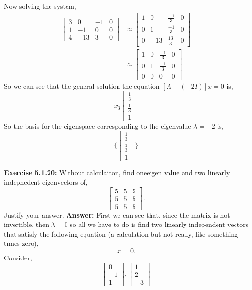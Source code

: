 \documentclass{amsart}
\begin{document}
Now solving the system,
\begin{align*}
\begin{bmatrix}
3&0& -1&0\\ 
1& -1& 0&0\\
4 &-13& 3&0
\end{bmatrix} 
&\approx
\begin{bmatrix}
1&0& \frac{-1}{3}&0\\ 
0& 1& \frac{-1}{3}&0\\
0&-13& \frac{13}{3}&0
\end{bmatrix} \\
&\approx
\begin{bmatrix}
1&0& \frac{-1}{3}&0\\ 
0& 1& \frac{-1}{3}&0\\
0 &0& 0&0
\end{bmatrix}
\end{align*}
So we can see that the general solution the equation $[A - (-2I)]x  = 0$ is,
\begin{equation*}
x_3
\begin{bmatrix}
\frac{1}{3}\\
\frac{1}{3}\\
1
\end{bmatrix}
\end{equation*}
So the basis for the eigenspace corresponding to the eigenvalue $\lambda  = -2$ is,
\begin{equation*}
\{ \begin{bmatrix}
\frac{1}{3}\\
\frac{1}{3}\\
1
\end{bmatrix}\}
\end{equation*}

\vspace{1in}


\noindent\textbf{Exercise 5.1.20: } Without calculaiton, find oneeigen value and two linearly indepnedent eigenvectors of,
\begin{equation*}
\begin{bmatrix}
5&5&5\\
5&5&5\\
5&5&5
\end{bmatrix}.
\end{equation*}
Justify your answer.
\noindent \textbf{Answer: } First we can see that, since the matrix is not invertible, then $\lambda = 0$ so all we have to do is find two linearly independent vectors that satisfy the following equation (a calculation but not really, like something times zero), 
\begin{equation*}
[A - (0 I)]x = 0.
\end{equation*}
Consider,
\begin{equation*}
 \begin{bmatrix}
0\\
-1\\
1
\end{bmatrix}, 
\begin{bmatrix}
1\\
2\\
-3
\end{bmatrix}
\end{equation*}
\end{document}
